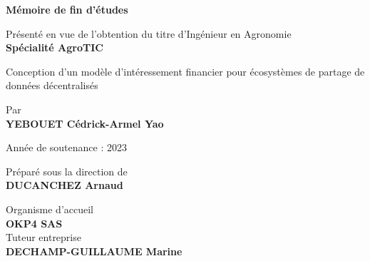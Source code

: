 \begin{titlepage}
    \begin{center}
        \begin{minipage}[c]{1\textwidth}
            \begin{center}
                \vspace{1.5cm}
                \textbf{\LARGE Mémoire de fin d'études}
            \end{center}
        \end{minipage}
        
        \vspace{.7cm}
        {Présenté en vue de l'obtention du titre d'Ingénieur en Agronomie}\\
        \vspace{.7cm}
        \textbf{Spécialité AgroTIC}
        
        \vspace{3.5cm}
        
        {\Large Conception d'un modèle d'intéressement financier pour écosystèmes de partage de données décentralisés}
        
        \vspace{2.5cm}
        
        Par\\
        \vspace{.3cm}
        {\textbf{YEBOUET Cédrick-Armel Yao}}
        
        \vspace{0.5cm}
        {Année de soutenance : 2023}
        
        \vspace{2cm}

        {Préparé sous la direction de}\\
        \vspace{.3cm}
        {\textbf{DUCANCHEZ Arnaud}}
        
        \vspace{2cm}

        {Organisme d'accueil}\\
        {\textbf{OKP4 SAS}}\\
        \vspace{0.5cm}
        {Tuteur entreprise}\\
        {\textbf{DECHAMP-GUILLAUME Marine}}
    \end{center}
\end{titlepage}